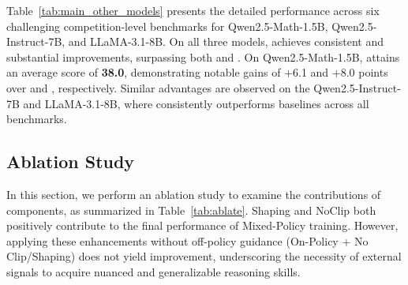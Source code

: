 Table~\ref{tab:main_other_models} presents the detailed performance across six challenging competition-level benchmarks for Qwen2.5-Math-1.5B, Qwen2.5-Instruct-7B, and LLaMA-3.1-8B.
On all three models,  achieves consistent and substantial improvements, surpassing both  and . 
On Qwen2.5-Math-1.5B,  attains an average score of \textbf{38.0}, demonstrating notable gains of +6.1 and +8.0 points over  and , respectively. 
Similar advantages are observed on the Qwen2.5-Instruct-7B and LLaMA-3.1-8B, where  consistently outperforms baselines across all benchmarks. 



\subsection{Ablation Study}
In this section, we perform an ablation study to examine the contributions of  components, as summarized in Table~\ref{tab:ablate}. 
Shaping and NoClip both positively contribute to the final performance of Mixed-Policy training.
However, applying these enhancements without off-policy guidance (On-Policy + No Clip/Shaping) does not yield improvement, underscoring the necessity of external signals to acquire nuanced and generalizable reasoning skills.


